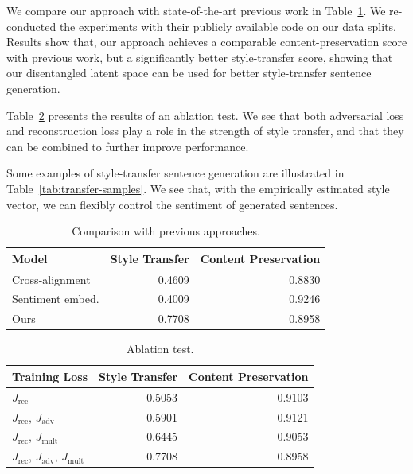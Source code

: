 We compare our approach with state-of-the-art previous work in Table~\ref{tab:comparison-previous}. We re-conducted the experiments with their publicly available code on our data splits.
Results show that, our approach achieves a comparable content-preservation score with previous work, but a significantly better style-transfer score, showing that our disentangled latent space can be used for better style-transfer sentence generation.

Table~\ref{tab:ablation-results} presents the results of an ablation test. We see that both adversarial loss and reconstruction loss play a role in the strength of style transfer, and that they can be combined to further improve performance.

Some examples of style-transfer sentence generation are illustrated in Table~\ref{tab:transfer-samples}. We see that, with the empirically estimated style vector, we can flexibly control the sentiment of generated sentences.

\begin{table}[!t]
	\centering
	\begin{tabular}{| l | r | r | }
		\hline
		\textbf{Model}                       & \textbf{Style Transfer} & \textbf{Content Preservation} \\
		\hline
		\hline
		Cross-alignment \cite{shen2017style} & 0.4609                  & 0.8830                        \\
		\hline
		Sentiment embed. \cite{fu2017style}  & 0.4009                  & 0.9246                        \\
		\hline
		Ours                                 & 0.7708                  & 0.8958                        \\
		\hline
	\end{tabular}
	\caption{Comparison with previous approaches.}
	\label{tab:comparison-previous}
\end{table}

\begin{table}[!t]
	\centering
	\begin{tabular}{| l | r | r |}
		\hline
		\textbf{Training Loss}                          & \textbf{Style Transfer} & \textbf{Content Preservation} \\
		\hline
		\hline
		$J_\text{rec}$                                  & 0.5053                  & 0.9103                        \\
		\hline
		$J_\text{rec}$, $J_\text{adv}$                  & 0.5901                  & 0.9121                        \\
		\hline
		$J_\text{rec}$, $J_\text{mult}$                 & 0.6445                  & 0.9053                        \\
		\hline
		$J_\text{rec}$, $J_\text{adv}$, $J_\text{mult}$ & 0.7708                  & 0.8958                        \\
		\hline
	\end{tabular}
	\caption{Ablation test.}
	\label{tab:ablation-results}
\end{table}

